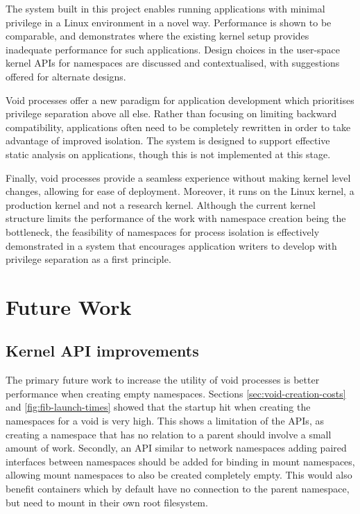 \documentclass[12pt,a4paper,twoside]{report}
\begin{document}
The system built in this project enables running applications with minimal privilege in a Linux environment in a novel way. Performance is shown to be comparable, and demonstrates where the existing kernel setup provides inadequate performance for such applications. Design choices in the user-space kernel APIs for namespaces are discussed and contextualised, with suggestions offered for alternate designs.

Void processes offer a new paradigm for application development which prioritises privilege separation above all else. Rather than focusing on limiting backward compatibility, applications often need to be completely rewritten in order to take advantage of improved isolation. The system is designed to support effective static analysis on applications, though this is not implemented at this stage.

Finally, void processes provide a seamless experience without making kernel level changes, allowing for ease of deployment. Moreover, it runs on the Linux kernel, a production kernel and not a research kernel. Although the current kernel structure limits the performance of the work with namespace creation being the bottleneck, the feasibility of namespaces for process isolation is effectively demonstrated in a system that encourages application writers to develop with privilege separation as a first principle.

\section{Future Work}
\label{sec:future-work}

\subsection{Kernel API improvements}
\label{sec:future-work-kernel-api}

The primary future work to increase the utility of void processes is better performance when creating empty namespaces. Sections \ref{sec:void-creation-costs} and \ref{fig:fib-launch-times} showed that the startup hit when creating the namespaces for a void is very high. This shows a limitation of the APIs, as creating a namespace that has no relation to a parent should involve a small amount of work. Secondly, an API similar to network namespaces adding paired interfaces between namespaces should be added for binding in mount namespaces, allowing mount namespaces to also be created completely empty. This would also benefit containers which by default have no connection to the parent namespace, but need to mount in their own root filesystem.
\end{document}
